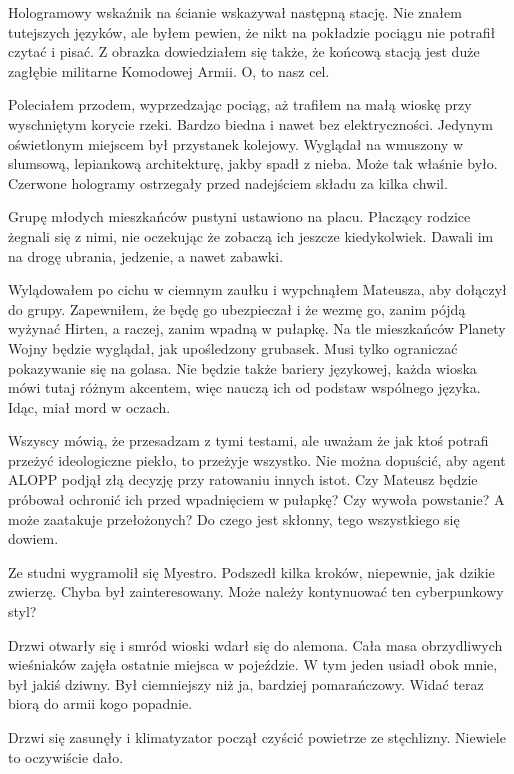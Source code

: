 Hologramowy wskaźnik na ścianie wskazywał następną stację.
Nie znałem tutejszych języków, ale byłem pewien, że nikt na pokładzie pociągu nie potrafił czytać i pisać.
Z obrazka dowiedziałem się także, że końcową stacją jest duże zagłębie militarne Komodowej Armii.
O, to nasz cel.

Poleciałem przodem, wyprzedzając pociąg, aż trafiłem na małą wioskę przy wyschniętym korycie rzeki.
Bardzo biedna i nawet bez elektryczności.
Jedynym oświetlonym miejscem był przystanek kolejowy.
Wyglądał na wmuszony w slumsową, lepiankową architekturę, jakby spadł z nieba. Może tak właśnie było.
Czerwone hologramy ostrzegały przed nadejściem składu za kilka chwil.

Grupę młodych mieszkańców pustyni ustawiono na placu.
Płaczący rodzice żegnali się z nimi, nie oczekując że zobaczą ich jeszcze kiedykolwiek.
Dawali im na drogę ubrania, jedzenie, a nawet zabawki.

Wylądowałem po cichu w ciemnym zaułku i wypchnąłem Mateusza, aby dołączył do grupy.
Zapewniłem, że będę go ubezpieczał i że wezmę go, zanim pójdą wyżynać Hirten, a raczej, zanim wpadną w pułapkę.
Na tle mieszkańców Planety Wojny będzie wyglądał, jak upośledzony grubasek. Musi tylko ograniczać pokazywanie się na golasa.
Nie będzie także bariery językowej, każda wioska mówi tutaj różnym akcentem, więc nauczą ich od podstaw wspólnego języka.
Idąc, miał mord w oczach.

Wszyscy mówią, że przesadzam z tymi testami, ale uważam że jak ktoś potrafi przeżyć ideologiczne piekło, to przeżyje wszystko.
Nie można dopuścić, aby agent ALOPP podjął złą decyzję przy ratowaniu innych istot.
Czy Mateusz będzie próbował ochronić ich przed wpadnięciem w pułapkę?
Czy wywoła powstanie?
A może zaatakuje przełożonych?
Do czego jest skłonny, tego wszystkiego się dowiem.

\divider{}

Ze studni wygramolił się Myestro.
Podszedł kilka kroków, niepewnie, jak dzikie zwierzę.
Chyba był zainteresowany. Może należy kontynuować ten cyberpunkowy styl?

\divider{}

Drzwi otwarły się i smród wioski wdarł się do alemona.
Cała masa obrzydliwych wieśniaków zajęła ostatnie miejsca w pojeździe.
W tym jeden usiadł obok mnie, był jakiś dziwny.
Był ciemniejszy niż ja, bardziej pomarańczowy.
Widać teraz biorą do armii kogo popadnie.

Drzwi się zasunęły i klimatyzator począł czyścić powietrze ze stęchlizny. Niewiele to oczywiście dało.

